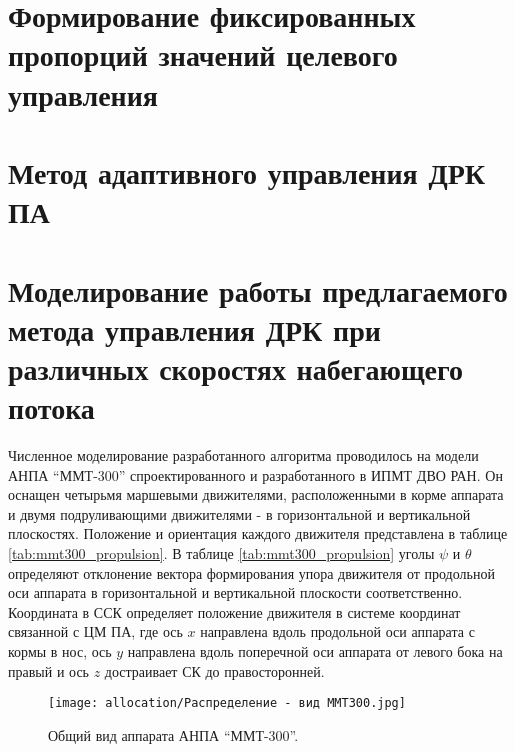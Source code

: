 \section{Формирование фиксированных пропорций значений целевого управления}\label{sec:Allocation/System}

\section{Метод адаптивного управления ДРК ПА} \label{sec:Allocation/Method}

\section{Моделирование работы предлагаемого метода управления ДРК при различных скоростях набегающего потока} \label{sec:Allocation/Test}
Численное моделирование разработанного алгоритма проводилось на модели АНПА ``ММТ-300'' спроектированного и разработанного в ИПМТ ДВО РАН.
Он оснащен четырьмя маршевыми движителями, расположенными в корме аппарата и двумя подруливающими движителями - в горизонтальной и вертикальной плоскостях.
Положение и ориентация каждого движителя представлена в таблице \ref{tab:mmt300_propulsion}.
В таблице \ref{tab:mmt300_propulsion} уголы $\psi$ и $\theta$ определяют отклонение вектора формирования упора движителя от продольной оси аппарата в горизонтальной и вертикальной плоскости соответственно.
Координата в ССК определяет положение движителя в системе координат связанной с ЦМ ПА, где ось $x$ направлена вдоль продольной оси аппарата с кормы в нос, ось $y$ направлена вдоль поперечной оси аппарата от левого бока на правый и ось $z$ достраивает СК до правосторонней.

\begin{figure}[ht]
    \centering
    \texttt{[image: allocation/Распределение - вид ММТ300.jpg]}
    \caption{Общий вид аппарата АНПА ``ММТ-300''.}
    \label{fig:mmt-300}
\end{figure}

